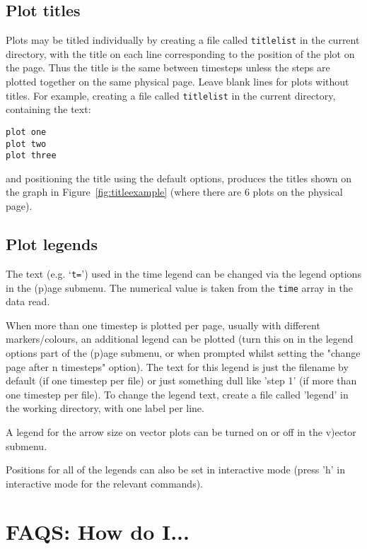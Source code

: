 \documentclass[a4paper,11pt]{article}
\begin{document}
\subsection{Plot titles}
\label{sec:title}
 Plots may be titled individually by creating a file called \verb+titlelist+ in
the current directory, with the title on each line corresponding to the position
of the plot on the page. Thus the title is the same between timesteps unless the
steps are plotted together on the same physical page. Leave blank lines for
plots without titles. For example, creating a file called \verb+titlelist+ in
the current directory, containing the text:
\begin{verbatim}
plot one
plot two
plot three
\end{verbatim}
and positioning the title using the default options, produces the titles shown
on the graph in Figure~\ref{fig:titleexample} (where there are 6 plots on the physical page).

%

\subsection{Plot legends}
\label{sec:legend}
 The text (e.g. `\verb+t=+') used in the time legend can be changed via
the legend options in the (p)age submenu. The numerical value is taken from the \verb+time+ array
in the data read.

When more than one timestep is plotted per page, usually with different markers/colours, an additional legend can be
plotted (turn this on in the legend options part of the (p)age submenu, or when prompted whilst setting the "change page
after n timesteps" option). The text for this legend is just the filename by default (if one timestep per file) or just
something dull like 'step 1' (if more than one timestep per file). To change the legend text, create
a file called 'legend' in the working directory, with one label per line.

 A legend for the arrow size on vector plots can be turned on or off in the v)ector submenu. 

 Positions for all of the legends can also be set in interactive mode (press 'h' in interactive mode for the relevant
 commands).

\section{FAQS: How do I...}
\end{document}
